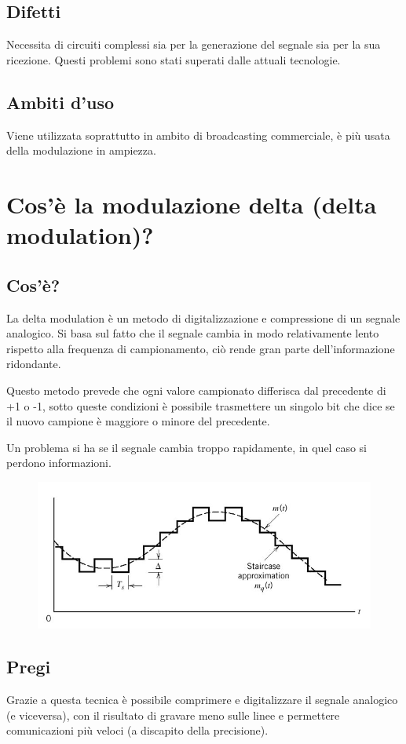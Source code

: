 \subsection{Difetti}
Necessita di circuiti complessi sia per la generazione del segnale sia per la sua ricezione. Questi problemi sono stati superati dalle attuali tecnologie.
\subsection{Ambiti d'uso}
Viene utilizzata soprattutto in ambito di broadcasting commerciale, è più usata della modulazione in ampiezza.

\section{Cos’è la modulazione delta (delta modulation)?}
\subsection{Cos'è?}
La delta modulation è un metodo di digitalizzazione e compressione di un segnale analogico.
Si basa sul fatto che il segnale cambia in modo relativamente lento rispetto alla frequenza di campionamento, ciò rende gran parte dell’informazione ridondante.

Questo metodo prevede che ogni valore campionato differisca dal precedente di +1 o -1, sotto queste condizioni è possibile trasmettere un singolo bit che dice se il nuovo campione è maggiore o minore del precedente.

Un problema si ha se il segnale cambia troppo rapidamente, in quel caso si perdono informazioni.


\begin{figure}[H]
\centering
\includegraphics[scale=0.6]{res/img/6_modulazioneDelta.png}
\end{figure}

 \subsection{Pregi}
 Grazie a questa tecnica è possibile comprimere e digitalizzare il segnale analogico (e viceversa), con il risultato di gravare meno sulle linee e permettere comunicazioni più veloci (a discapito della precisione).
